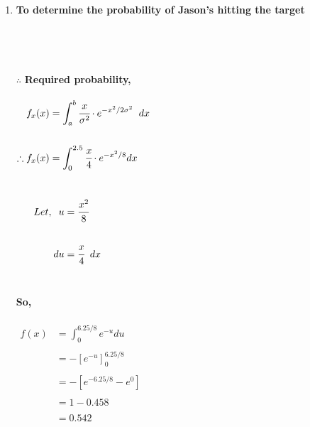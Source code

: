 \documentclass{article}
\begin{document}
\begin{enumerate}
\begin{enumerate}
    \item \textbf{To determine the probability of Jason’s hitting the target}\\\\
\\ \\\\
$\therefore$ \textbf{Required probability,}\\\\
$\begin{aligned}
f_x(x) &= \int_a^b \cfrac{x}{\sigma ^2} \cdot e^{-x^2/2\sigma ^2} \hspace{2mm}dx\\\\
\therefore f_x(x) &= \int_0^{2.5} \cfrac{x}{4} \cdot e^{-x^2/8} dx
\end{aligned}$\\\\\\
$\begin{aligned}
\hspace{6mm} Let, \hspace{2mm} u &= \cfrac{x^2}{8}\\\\
 du &= \cfrac{x}{4} \hspace{2mm} dx\\\\
\end{aligned}$\\\\
\textbf{So,}\\\\
$\begin{aligned}
f(x) &= \int_0^{6.25/8} e^{-u} du\\\\
&= - [ e^{-u} ]_0^{6.25/8}\\\\
&= - [ e^{-6.25/8} - e^0 ]\\\\
&= 1 - 0.458\\\\
&= 0.542
\end{aligned}$


\end{enumerate}
\end{enumerate}
\end{document}
